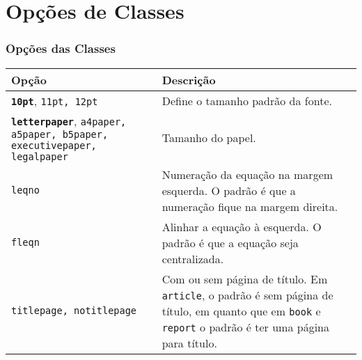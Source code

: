 \documentclass[brazilian]{beamer}
\begin{document}
\section{Opções de Classes}

\begin{frame}
    \frametitle{Opções das Classes}
    \begin{table}[h]\small
        \begin{tabularx}{\textwidth}{m{4cm}X}
            \hline
            \textbf{Opção}                                                                                & \textbf{Descrição}                                                                                                                                                         \\ \hline
            \textbf{\texttt{10pt}}, \texttt{11pt, 12pt}                                                   & Define o tamanho padrão da fonte.                                                                                                                                          \\ \hline
            \textbf{\texttt{letterpaper}}, \texttt{a4paper, a5paper, b5paper, executivepaper, legalpaper} & Tamanho do papel.                                                                                                                                                          \\ \hline
            \texttt{leqno}                                                                                & Numeração da equação na margem esquerda. O padrão é que a numeração fique na margem direita.                                                                               \\ \hline
            \texttt{fleqn}                                                                                & Alinhar a equação à esquerda. O padrão é que a equação seja centralizada.                                                                                                  \\ \hline
            \texttt{titlepage, notitlepage}                                                               & Com ou sem página de título. Em \texttt{article}, o padrão é sem página de título, em quanto que em \texttt{book} e \texttt{report} o padrão é ter uma página para título. \\ \hline
        \end{tabularx}
    \end{table}
\end{frame}
\end{document}
